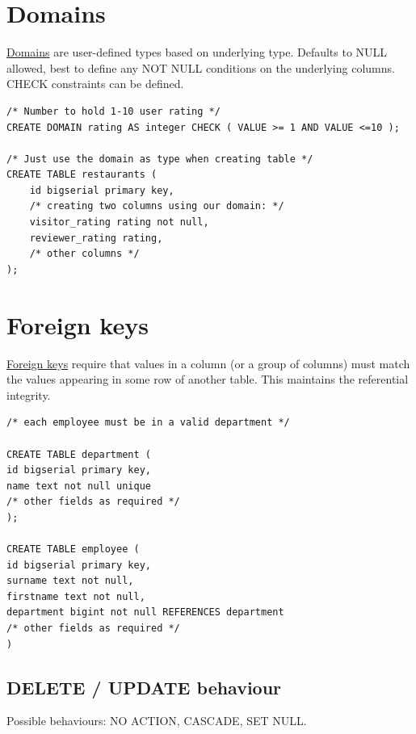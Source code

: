 \documentclass[slides]{pgnotes}
\begin{document}
\section{Domains}\label{sec:domains}

\href{https://www.postgresql.org/docs/13/domains.html}{Domains} are
user-defined types based on underlying type. Defaults to NULL allowed,
best to define any NOT NULL conditions on the underlying columns. CHECK
constraints can be defined.

\begin{verbatim}
/* Number to hold 1-10 user rating */
CREATE DOMAIN rating AS integer CHECK ( VALUE >= 1 AND VALUE <=10 );

/* Just use the domain as type when creating table */
CREATE TABLE restaurants (
    id bigserial primary key,
    /* creating two columns using our domain: */
    visitor_rating rating not null,
    reviewer_rating rating, 
    /* other columns */
);
\end{verbatim}



\section{Foreign keys}\label{foreign-keys}

\href{https://www.postgresql.org/docs/13/ddl-constraints.html\#DDL-CONSTRAINTS-FK}{Foreign
keys} require that values in a column (or a group of columns) must match
the values appearing in some row of another table. This maintains the
referential integrity.

\begin{verbatim}
/* each employee must be in a valid department */

CREATE TABLE department (
id bigserial primary key,
name text not null unique
/* other fields as required */
);

CREATE TABLE employee (
id bigserial primary key,
surname text not null,
firstname text not null,
department bigint not null REFERENCES department
/* other fields as required */
)
\end{verbatim}

\subsection{DELETE / UPDATE behaviour}\label{delete-update-behaviour}

Possible behaviours: NO ACTION, CASCADE, SET NULL.
\end{document}
